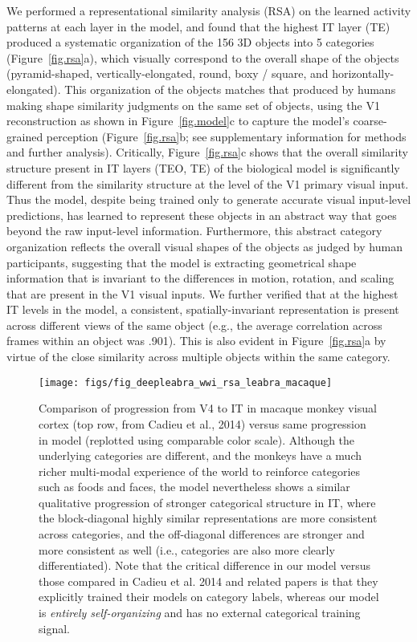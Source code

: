\documentclass[12pt,twoside]{naturefigs}  %
\newif\myifpdf
\begin{document}
We performed a representational similarity analysis (RSA) on the learned activity patterns at each layer in the model, and found that the highest IT layer (TE) produced a systematic organization of the 156 3D objects into 5 categories (Figure~\ref{fig.rsa}a), which visually correspond to the overall shape of the objects (pyramid-shaped, vertically-elongated, round, boxy / square, and horizontally-elongated). This organization of the objects matches that produced by humans making shape similarity judgments on the same set of objects, using the V1 reconstruction as shown in Figure~\ref{fig.model}c to capture the model's coarse-grained perception (Figure~\ref{fig.rsa}b; see supplementary information for methods and further analysis).  Critically, Figure~\ref{fig.rsa}c shows that the overall similarity structure present in IT layers (TEO, TE) of the biological model is significantly different from the similarity structure at the level of the V1 primary visual input.  Thus the model, despite being trained only to generate accurate visual input-level predictions, has learned to represent these objects in an abstract way that goes beyond the raw input-level information.  Furthermore, this abstract category organization reflects the overall visual shapes of the objects as judged by human participants, suggesting that the model is extracting geometrical shape information that is invariant to the differences in motion, rotation, and scaling that are present in the V1 visual inputs.  We further verified that at the highest IT levels in the model, a consistent, spatially-invariant representation is present across different views of the same object (e.g., the average correlation across frames within an object was .901).  This is also evident in Figure~\ref{fig.rsa}a by virtue of the close similarity across multiple objects within the same category.

\begin{figure}
  \centering\texttt{[image: figs/fig\_deepleabra\_wwi\_rsa\_leabra\_macaque]}
  \caption{\small \protect{} Comparison of progression from V4 to IT in macaque monkey visual cortex (top row, from Cadieu et al., 2014) versus same progression in model (replotted using comparable color scale).  Although the underlying categories are different, and the monkeys have a much richer multi-modal experience of the world to reinforce categories such as foods and faces, the model nevertheless shows a similar qualitative progression of stronger categorical structure in IT, where the block-diagonal highly similar representations are more consistent across categories, and the off-diagonal differences are stronger and more consistent as well (i.e., categories are also more clearly differentiated).  Note that the critical difference in our model versus those compared in Cadieu et al. 2014 and related papers is that they explicitly trained their models on category labels, whereas our model is {\em entirely self-organizing} and has no external categorical training signal.}
  \label{fig.macaque}
\end{figure}
\end{document}
